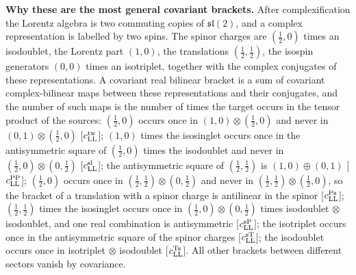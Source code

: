 \documentclass[
  10pt,
]{article}
\begin{document}
\textbf{Why these are the most general covariant brackets.} After
complexification the Lorentz algebra is two commuting copies of
\(\mathfrak{sl}(2)\), and a complex representation is labelled by two
spins. The spinor charges are \((\tfrac12,0)\) times an isodoublet, the
Lorentz part \((1,0)\), the translations \((\tfrac12,\tfrac12)\), the
isospin generators \((0,0)\) times an isotriplet, together with the
complex conjugates of these representations. A covariant real bilinear
bracket is a sum of covariant complex-bilinear maps between these
representations and their conjugates, and the number of such maps is the
number of times the target occurs in the tensor product of the sources:
\((\tfrac12,0)\) occurs once in \((1,0)\otimes(\tfrac12,0)\) and never
in \((0,1)\otimes(\tfrac12,0)\) {[}\(c^{\rm tw}_{\rm LL}\){]}; \((1,0)\)
times the isosinglet occurs once in the antisymmetric square of
\((\tfrac12,0)\) times the isodoublet and never in
\((\tfrac12,0)\otimes(0,\tfrac12)\) {[}\(c^{\rm sl}_{\rm LL}\){]}; the
antisymmetric square of \((\tfrac12,\tfrac12)\) is \((1,0)\oplus(0,1)\)
{[}\(c^{\rm PP}_{\rm LL}\){]}; \((\tfrac12,0)\) occurs once in
\((\tfrac12,\tfrac12)\otimes(0,\tfrac12)\) and never in
\((\tfrac12,\tfrac12)\otimes(\tfrac12,0)\), so the bracket of a
translation with a spinor charge is antilinear in the spinor
{[}\(c^{\rm Ps}_{\rm LL}\){]}; \((\tfrac12,\tfrac12)\) times the
isosinglet occurs once in \((\tfrac12,0)\otimes(0,\tfrac12)\) times
isodoublet \(\otimes\) isodoublet, and one real combination is
antisymmetric {[}\(c^{\rm sP}_{\rm LL}\){]}; the isotriplet occurs once
in the antisymmetric square of the spinor charges
{[}\(c^{\rm sT}_{\rm LL}\){]}; the isodoublet occurs once in isotriplet
\(\otimes\) isodoublet {[}\(c^{\rm Ts}_{\rm LL}\){]}. All other brackets
between different sectors vanish by covariance.
\end{document}
